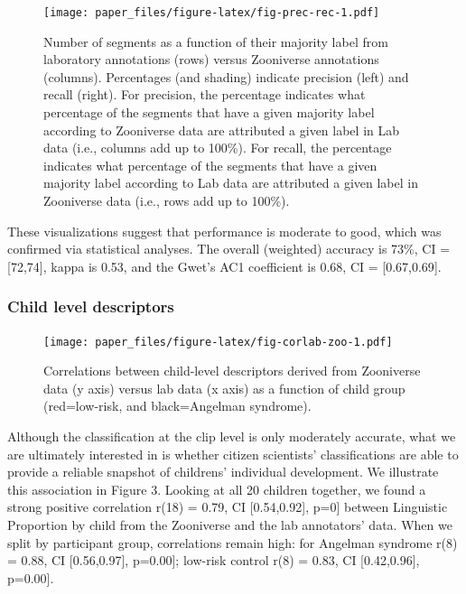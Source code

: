 \documentclass[english,,man]{apa6}
\begin{document}
\begin{figure}
\centering
\texttt{[image: paper\_files/figure-latex/fig-prec-rec-1.pdf]}
\caption{\label{fig:fig-prec-rec}Number of segments as a function of their majority label from laboratory annotations (rows) versus Zooniverse annotations (columns). Percentages (and shading) indicate precision (left) and recall (right). For precision, the percentage indicates what percentage of the segments that have a given majority label according to Zooniverse data are attributed a given label in Lab data (i.e., columns add up to 100\%). For recall, the percentage indicates what percentage of the segments that have a given majority label according to Lab data are attributed a given label in Zooniverse data (i.e., rows add up to 100\%).}
\end{figure}

These visualizations suggest that performance is moderate to good, which was confirmed via statistical analyses. The overall (weighted) accuracy is 73\%, CI = {[}72,74{]}, kappa is 0.53, and the Gwet's AC1 coefficient is 0.68, CI = {[}0.67,0.69{]}.

\hypertarget{child-level-descriptors}{%
\subsubsection{Child level descriptors}\label{child-level-descriptors}}

\begin{figure}
\centering
\texttt{[image: paper\_files/figure-latex/fig-corlab-zoo-1.pdf]}
\caption{\label{fig:fig-corlab-zoo}Correlations between child-level descriptors derived from Zooniverse data (y axis) versus lab data (x axis) as a function of child group (red=low-risk, and black=Angelman syndrome).}
\end{figure}

Although the classification at the clip level is only moderately accurate, what we are ultimately interested in is whether citizen scientists' classifications are able to provide a reliable snapshot of childrens' individual development. We illustrate this association in Figure 3. Looking at all 20 children together, we found a strong positive correlation r(18) = 0.79, CI {[}0.54,0.92{]}, p=0{]} between Linguistic Proportion by child from the Zooniverse and the lab annotators' data. When we split by participant group, correlations remain high: for Angelman syndrome r(8) = 0.88, CI {[}0.56,0.97{]}, p=0.00{]}; low-risk control r(8) = 0.83, CI {[}0.42,0.96{]}, p=0.00{]}.
\end{document}
